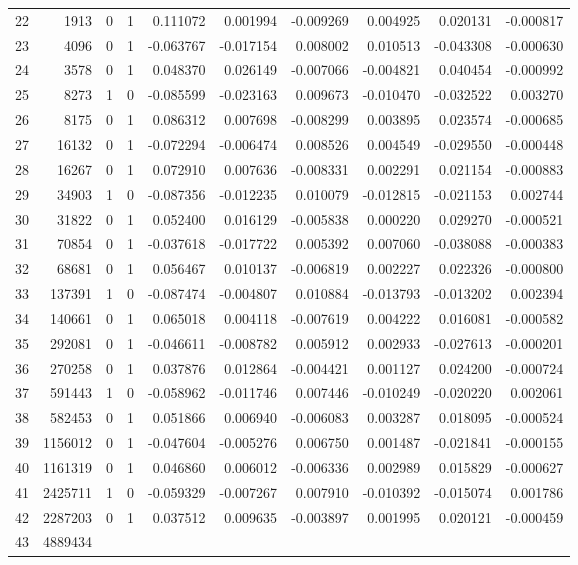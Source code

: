\documentclass[12pt]{amsart}
\begin{document}
\begin{table}
{\begin{tabular}{|r|rrrrrrrrr|}
 22 &1913 
&0&1
&0.111072	&0.001994	&-0.009269
&0.004925	&0.020131	&-0.000817
\\
 23 &4096 
&0&1
&-0.063767	&-0.017154	&0.008002
&0.010513	&-0.043308	&-0.000630
\\
 24 &3578 
&0&1
&0.048370	&0.026149	&-0.007066
&-0.004821	&0.040454	&-0.000992
\\
 25 &8273 
&1&0
&-0.085599	&-0.023163	&0.009673
&-0.010470	&-0.032522	&0.003270
\\
 26 &8175 
&0&1
&0.086312	&0.007698	&-0.008299
&0.003895	&0.023574	&-0.000685
\\
 27 &16132 
&0&1
&-0.072294	&-0.006474	&0.008526
&0.004549	&-0.029550	&-0.000448
\\
 28 &16267 
&0&1
&0.072910	&0.007636	&-0.008331
&0.002291	&0.021154	&-0.000883
\\
 29 &34903 
&1&0
&-0.087356	&-0.012235	&0.010079
&-0.012815	&-0.021153	&0.002744
\\
 30 &31822 
&0&1
&0.052400	&0.016129	&-0.005838
&0.000220	&0.029270	&-0.000521
\\
 31 &70854 
&0&1
&-0.037618	&-0.017722	&0.005392
&0.007060	&-0.038088	&-0.000383
\\
 32 &68681 
&0&1
&0.056467	&0.010137	&-0.006819
&0.002227	&0.022326	&-0.000800
\\
 33 &137391 
&1&0
&-0.087474	&-0.004807	&0.010884
&-0.013793	&-0.013202	&0.002394
\\
 34 &140661 
&0&1
&0.065018	&0.004118	&-0.007619
&0.004222	&0.016081	&-0.000582
\\
 35 &292081 
&0&1
&-0.046611	&-0.008782	&0.005912
&0.002933	&-0.027613	&-0.000201
\\
 36 &270258 
&0&1
&0.037876	&0.012864	&-0.004421
&0.001127	&0.024200	&-0.000724
\\
 37 &591443 
&1&0
&-0.058962	&-0.011746	&0.007446
&-0.010249	&-0.020220	&0.002061
\\
 38 &582453 
&0&1
&0.051866	&0.006940	&-0.006083
&0.003287	&0.018095	&-0.000524
\\
 39 &1156012 
&0&1
&-0.047604	&-0.005276	&0.006750
&0.001487	&-0.021841	&-0.000155
\\
 40 &1161319 
&0&1
&0.046860	&0.006012	&-0.006336
&0.002989	&0.015829	&-0.000627
\\
 41 &2425711 
&1&0
&-0.059329	&-0.007267	&0.007910
&-0.010392	&-0.015074	&0.001786
\\
 42 &2287203 
&0&1
&0.037512	&0.009635	&-0.003897
&0.001995	&0.020121	&-0.000459
\\
 43 &4889434 

\end{tabular}}
\end{table}
\end{document}
